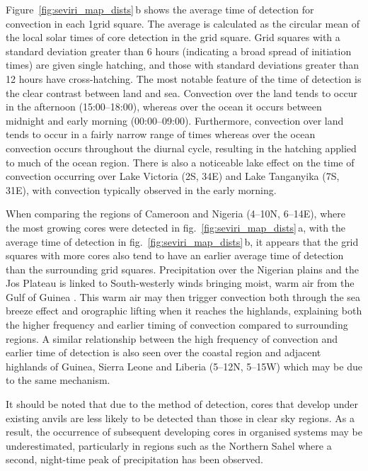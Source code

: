 Figure~\ref{fig:seviri_map_dists}\,b shows the average time of detection for convection in each 1\textdegree grid square. 
The average is calculated as the circular mean of the local solar times of core detection in the grid square. 
Grid squares with a standard deviation greater than 6 hours (indicating a broad spread of initiation times) are given single hatching, and those with standard deviations greater than 12 hours have cross-hatching. 
The most notable feature of the time of detection is the clear contrast between land and sea. 
Convection over the land tends to occur in the afternoon (15:00--18:00), whereas over the ocean it occurs between midnight and early morning (00:00--09:00). 
Furthermore, convection over land tends to occur in a fairly narrow range of times whereas over the ocean convection occurs throughout the diurnal cycle, resulting in the hatching applied to much of the ocean region. 
There is also a noticeable lake effect on the time of convection occurring over Lake Victoria (2\textdegree S, 34\textdegree E) and Lake Tanganyika (7\textdegree S, 31\textdegree E), with convection typically observed in the early morning.

When comparing the regions of Cameroon and Nigeria (4--10\textdegree N, 6--14\textdegree E), where the most growing cores were detected in fig.~\ref{fig:seviri_map_dists}\,a, with the average time of detection in fig.~\ref{fig:seviri_map_dists}\,b, it appears that the grid squares with more cores also tend to have an earlier average time of detection than the surrounding grid squares. 
Precipitation over the Nigerian plains and the Jos Plateau is linked to South-westerly winds bringing moist, warm air from the Gulf of Guinea \citep{vondou_seasonal_2010}. 
This warm air may then trigger convection both through the sea breeze effect and orographic lifting when it reaches the highlands, explaining both the higher frequency and earlier timing of convection compared to surrounding regions. 
A similar relationship between the high frequency of convection and earlier time of detection is also seen over the coastal region and adjacent highlands of Guinea, Sierra Leone and Liberia (5--12\textdegree N, 5--15\textdegree W) which may be due to the same mechanism.

It should be noted that due to the method of detection, cores that develop under existing anvils are less likely to be detected than those in clear sky regions. 
As a result, the occurrence of subsequent developing cores in organised systems may be underestimated, particularly in regions such as the Northern Sahel where a second, night-time peak of precipitation has been observed.

